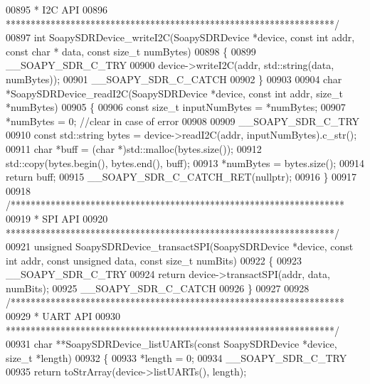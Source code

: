 \begin{DoxyCode}
00895 \textcolor{comment}{ * I2C API}
00896 \textcolor{comment}{ ******************************************************************/}
00897 \textcolor{keywordtype}{int} SoapySDRDevice_writeI2C(SoapySDRDevice *device, \textcolor{keyword}{const} \textcolor{keywordtype}{int} addr, \textcolor{keyword}{const} \textcolor{keywordtype}{char} *
      data, \textcolor{keyword}{const} \textcolor{keywordtype}{size\_t} numBytes)
00898 \{
00899     __SOAPY_SDR_C_TRY
00900     device->writeI2C(addr, std::string(data, numBytes));
00901     __SOAPY_SDR_C_CATCH
00902 \}
00903 
00904 \textcolor{keywordtype}{char} *SoapySDRDevice_readI2C(SoapySDRDevice *device, \textcolor{keyword}{const} \textcolor{keywordtype}{int} addr, \textcolor{keywordtype}{size\_t} *numBytes)
00905 \{
00906     \textcolor{keyword}{const} \textcolor{keywordtype}{size\_t} inputNumBytes = *numBytes;
00907     *numBytes = 0; \textcolor{comment}{//clear in case of error}
00908 
00909     __SOAPY_SDR_C_TRY
00910     \textcolor{keyword}{const} std::string bytes = device->readI2C(addr, inputNumBytes).c\_str();
00911     \textcolor{keywordtype}{char} *buff = (\textcolor{keywordtype}{char} *)std::malloc(bytes.size());
00912     std::copy(bytes.begin(), bytes.end(), buff);
00913     *numBytes = bytes.size();
00914     \textcolor{keywordflow}{return} buff;
00915     __SOAPY_SDR_C_CATCH_RET(\textcolor{keyword}{nullptr});
00916 \}
00917 
00918 \textcolor{comment}{/*******************************************************************}
00919 \textcolor{comment}{ * SPI API}
00920 \textcolor{comment}{ ******************************************************************/}
00921 \textcolor{keywordtype}{unsigned} SoapySDRDevice_transactSPI(SoapySDRDevice *device, \textcolor{keyword}{const} \textcolor{keywordtype}{int} addr, \textcolor{keyword}{const} \textcolor{keywordtype}{unsigned} 
      data, \textcolor{keyword}{const} \textcolor{keywordtype}{size\_t} numBits)
00922 \{
00923     __SOAPY_SDR_C_TRY
00924     \textcolor{keywordflow}{return} device->transactSPI(addr, data, numBits);
00925     __SOAPY_SDR_C_CATCH
00926 \}
00927 
00928 \textcolor{comment}{/*******************************************************************}
00929 \textcolor{comment}{ * UART API}
00930 \textcolor{comment}{ ******************************************************************/}
00931 \textcolor{keywordtype}{char} **SoapySDRDevice_listUARTs(\textcolor{keyword}{const} SoapySDRDevice *device, \textcolor{keywordtype}{size\_t} *length)
00932 \{
00933     *length = 0;
00934     __SOAPY_SDR_C_TRY
00935     \textcolor{keywordflow}{return} toStrArray(device->listUARTs(), length);

\end{DoxyCode}
